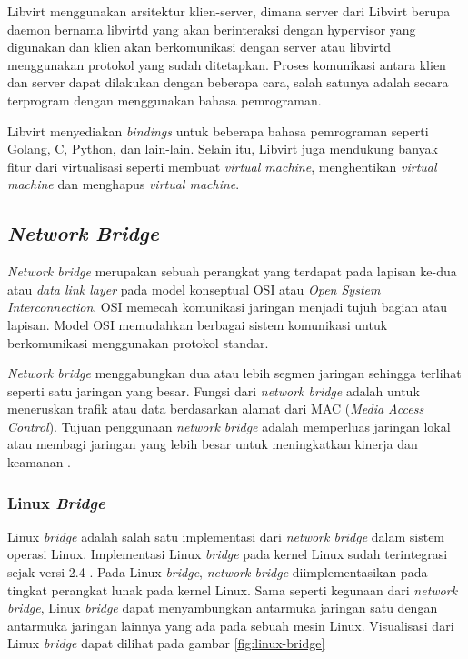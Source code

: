 Libvirt menggunakan arsitektur klien-server, dimana server dari Libvirt berupa daemon
bernama libvirtd yang akan berinteraksi dengan hypervisor yang digunakan dan klien akan
berkomunikasi dengan server atau libvirtd menggunakan protokol yang sudah ditetapkan.
Proses komunikasi antara klien dan server dapat dilakukan dengan beberapa cara, salah
satunya adalah secara terprogram dengan menggunakan bahasa pemrograman.

Libvirt menyediakan \emph{bindings} untuk beberapa bahasa pemrograman seperti Golang, C, Python, dan
lain-lain. Selain itu, Libvirt juga mendukung banyak fitur dari virtualisasi seperti
membuat \emph{virtual machine}, menghentikan \emph{virtual machine} dan menghapus \emph{virtual machine}.

\subsection{\emph{Network Bridge}}
\label{sec:network-bridge}

\emph{Network bridge} merupakan sebuah perangkat yang terdapat pada lapisan ke-dua atau \emph{data link layer} pada
model konseptual OSI atau \emph{Open System Interconnection}. OSI memecah komunikasi jaringan
menjadi tujuh bagian atau lapisan. Model OSI memudahkan berbagai sistem komunikasi
untuk berkomunikasi menggunakan protokol standar.

\emph{Network bridge} menggabungkan dua atau lebih segmen jaringan sehingga terlihat
seperti satu jaringan yang besar. Fungsi dari \emph{network bridge} adalah untuk meneruskan
trafik atau data berdasarkan alamat dari MAC (\emph{Media Access Control}). Tujuan
penggunaan \emph{network bridge} adalah memperluas jaringan lokal atau
membagi jaringan yang lebih besar untuk meningkatkan kinerja dan keamanan \parencite{network-bridge}.

\subsubsection{Linux \emph{Bridge}}

Linux \emph{bridge} adalah salah satu implementasi dari \emph{network bridge} dalam sistem
operasi Linux. Implementasi Linux \emph{bridge} pada kernel Linux sudah
terintegrasi sejak versi 2.4 \parencite{linux-foundation-bridge-website}.
Pada Linux \emph{bridge}, \emph{network bridge} diimplementasikan pada tingkat
perangkat lunak pada kernel Linux. Sama seperti kegunaan dari \emph{network bridge},
Linux \emph{bridge} dapat menyambungkan antarmuka jaringan satu dengan antarmuka jaringan
lainnya yang ada pada sebuah mesin Linux. Visualisasi dari Linux \emph{bridge}
dapat dilihat pada gambar \ref{fig:linux-bridge}


